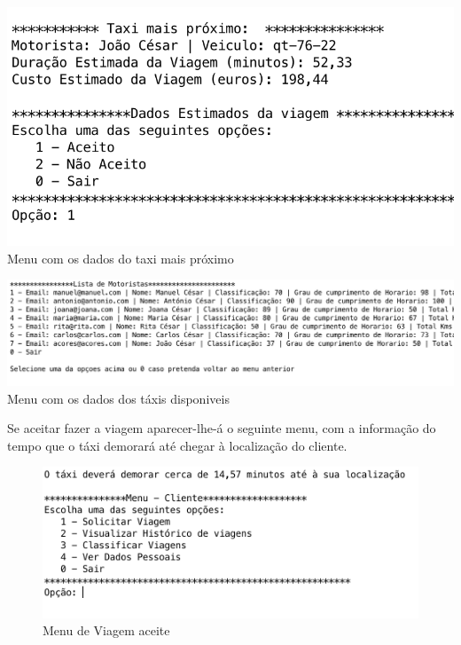 \begin{enumerate}
\noindent\begin{minipage}[b]{.4\textwidth}
	\includegraphics[scale=0.4]{imagem/taxiMaisProx}
	\small{Menu com os dados do taxi mais próximo}
\end{minipage} 
\hfill
\begin{minipage}[b]{.45\textwidth}
	\includegraphics[scale=0.35]{imagem/escolherTaxiEspecifico}
	\small{Menu com os dados dos táxis disponiveis}
\end{minipage}
\hfill

\newpage
Se aceitar fazer a viagem aparecer-lhe-á o seguinte menu, com a informação do tempo que o táxi demorará até chegar à localização do cliente. 

\begin{figure}[htpb]
	\centering
	\includegraphics[scale=0.6]{imagem/aceitarViagem}
	\caption{Menu de Viagem aceite }
	\label{p3:fig:p3_aceitarViagem}
\end{figure}


\end{enumerate}
